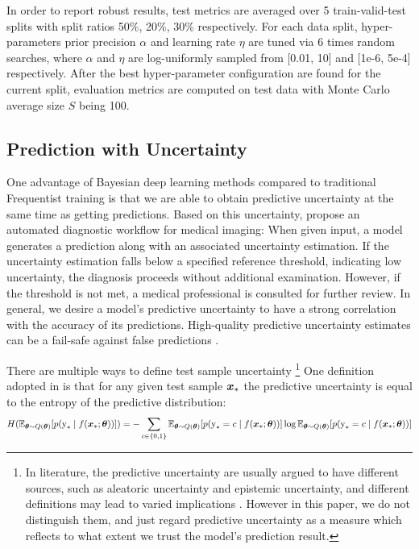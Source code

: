 \documentclass[10pt]{article} %
\begin{document}
In order to report robust results, test metrics are averaged over 5 train-valid-test splits with split ratios  50\%, 20\%, 30\% respectively. For each data split, hyper-parameters prior precision $\alpha$ and learning rate $\eta$ are tuned via 6 times random searches, where $\alpha$ and $\eta$ are log-uniformly sampled from [0.01, 10] and [1e-6, 5e-4] respectively. After the best hyper-parameter configuration are found for the current split, evaluation metrics are computed on test data with Monte Carlo average size $S$ being 100.

\subsection{Prediction with Uncertainty}
One advantage of Bayesian deep learning methods compared to traditional Frequentist training is that we are able to obtain predictive uncertainty at the same time as getting predictions. Based on this uncertainty, \cite{band2022benchmarking} propose an automated diagnostic workflow for medical imaging: When given input, a model generates a prediction along with an associated uncertainty estimation. If the uncertainty estimation falls below a specified reference threshold, indicating low uncertainty, the diagnosis proceeds without additional examination. However, if the threshold is not met, a medical professional is consulted for further review. In general, we desire a model's predictive uncertainty to have a strong correlation with the accuracy of its predictions. High-quality predictive uncertainty estimates can be a fail-safe against false predictions 
\cite{band2022benchmarking}. 

There are multiple ways to define test sample uncertainty \footnote{In literature, the predictive uncertainty are usually argued to have different sources, such as aleatoric uncertainty and epistemic uncertainty, and different definitions may lead to varied implications \cite{ulmer2023prior, d2021repulsive}. However in this paper, we do not distinguish them, and just regard predictive uncertainty as a measure which reflects to what extent we trust the model's prediction result.} One definition adopted in \cite{band2022benchmarking} is that for any given test sample ${\bm{x}}_*$ the predictive uncertainty is equal to the entropy of the predictive distribution: 
\begin{equation}
H(\mathbb{E}_{{\bm{\theta}} \sim Q({\bm{\theta}})}[p({\textnormal{y}}_* \mid f({\bm{x}}_* ; {\bm{\theta}}))])=-\sum_{c \in\{0,1\}} \mathbb{E}_{{\bm{\theta}} \sim Q({\bm{\theta}})}[p({\textnormal{y}}_*=c \mid f({\bm{x}}_* ; {\bm{\theta}}))] \log \mathbb{E}_{{\bm{\theta}} \sim Q({\bm{\theta}})} [p({\textnormal{y}}_*=c \mid f({\bm{x}}_* ; {\bm{\theta}}))]
\end{equation}
\end{document}
